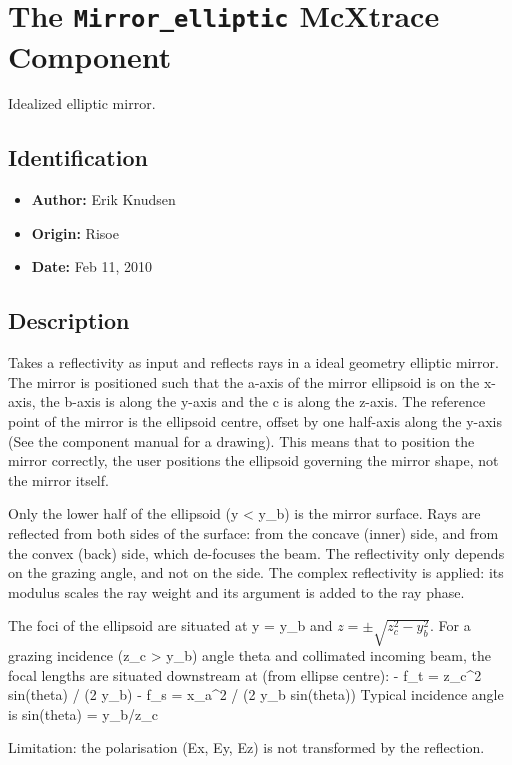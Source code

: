 \section{The \texttt{Mirror\_elliptic} McXtrace Component}
Idealized elliptic mirror.

\subsection*{Identification}
\begin{itemize}
  \item \textbf{Author:} Erik Knudsen
  \item \textbf{Origin:} Risoe
  \item \textbf{Date:} Feb 11, 2010
\end{itemize}

\subsection*{Description}
Takes a reflectivity as input and reflects rays in a ideal geometry elliptic mirror. The mirror is positioned such that the a-axis of the mirror ellipsoid is on the x-axis, the b-axis is along the y-axis and the c is along the z-axis. The reference point of the mirror is the ellipsoid centre, offset by one half-axis along the y-axis (See the component manual for a drawing). This means that to position the mirror correctly, the user positions the ellipsoid governing the mirror shape, not the mirror itself.

Only the lower half of the ellipsoid (y \textless{} y\_b) is the mirror surface. Rays are reflected from both sides of the surface: from the concave (inner) side, and from the convex (back) side, which de-focuses the beam. The reflectivity only depends on the grazing angle, and not on the side. The complex reflectivity is applied: its modulus scales the ray weight and its argument is added to the ray phase.

The foci of the ellipsoid are situated at y = y\_b and $z = \pm\sqrt{z_c^2 - y_b^2}$. For a grazing incidence (z\_c \textgreater{} y\_b) angle theta and collimated incoming beam, the focal lengths are situated downstream at (from ellipse centre): - f\_t = z\_c\textasciicircum{}2 sin(theta) / (2 y\_b) - f\_s = x\_a\textasciicircum{}2 / (2 y\_b sin(theta)) Typical incidence angle is sin(theta) = y\_b/z\_c

Limitation: the polarisation (Ex, Ey, Ez) is not transformed by the reflection.

